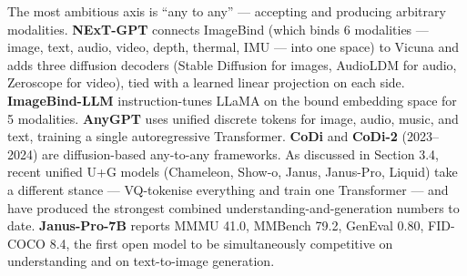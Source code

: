 \documentclass{article}
\begin{document}
The most ambitious axis is ``any to any'' --- accepting and producing arbitrary modalities. \textbf{NExT-GPT} \citep{wu20242024} connects ImageBind (which binds 6 modalities --- image, text, audio, video, depth, thermal, IMU --- into one space) to Vicuna and adds three diffusion decoders (Stable Diffusion for images, AudioLDM for audio, Zeroscope for video), tied with a learned linear projection on each side. \textbf{ImageBind-LLM} \citep{han20232023} instruction-tunes LLaMA on the bound embedding space for 5 modalities. \textbf{AnyGPT} uses unified discrete tokens for image, audio, music, and text, training a single autoregressive Transformer. \textbf{CoDi} and \textbf{CoDi-2} (2023--2024) are diffusion-based any-to-any frameworks. As discussed in Section 3.4, recent unified U+G models (Chameleon, Show-o, Janus, Janus-Pro, Liquid) take a different stance --- VQ-tokenise everything and train one Transformer --- and have produced the strongest combined understanding-and-generation numbers to date. \textbf{Janus-Pro-7B} reports MMMU 41.0, MMBench 79.2, GenEval 0.80, FID-COCO 8.4, the first open model to be simultaneously competitive on understanding and on text-to-image generation.
\end{document}

